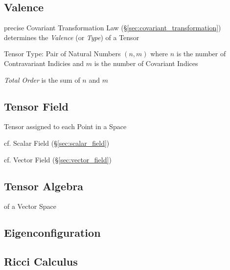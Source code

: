 \subsection{Valence}\label{sec:valence}

precise Covariant Transformation Law
(\S\ref{sec:covariant_transformation}) determines the \emph{Valence}
(or \emph{Type}) of a Tensor

Tensor Type: Pair of Natural Numbers $(n,m)$ where $n$ is the number
of Contravariant Indicies and $m$ is the number of Covariant Indices

\emph{Total Order} is the sum of $n$ and $m$



\subsection{Tensor Field}\label{sec:tensor_field}

Tensor assigned to each Point in a Space

cf. Scalar Field (\S\ref{sec:scalar_field})

cf. Vector Field (\S\ref{sec:vector_field})



\subsection{Tensor Algebra}\label{sec:tensor_algebra}

of a Vector Space



\subsection{Eigenconfiguration}\label{sec:eigenconfiguration}

\subsection{Ricci Calculus}\label{sec:ricci_calculus}

